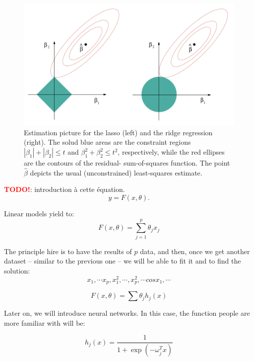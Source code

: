 \documentclass[a4paper]{tufte-book}
\newcommand{\TODO}{\textcolor{red}{\bf TODO!}\xspace}
\begin{document}
\begin{figure}
    \includegraphics{./Figures/sparsity.png}
    \caption{Estimation picture for the lasso (left) and the ridge regression
        (right). The solud blue areas are the constraint regions
        $|\beta_1| + |\beta_2| \leq t$ and $\beta_1^2 + \beta_2^2 \leq t^2$,
        respectively, while the red ellipses are the contours of the residual-
        sum-of-squares function. The point $\hat \beta$ depicts the usual
        (unconstrained) least-squares estimate.
    }
    \label{sparsity}
\end{figure}

\TODO: introduction à cette équation.
\begin{equation}
    y=F(x,\theta).
\end{equation}

Linear models yield to:
\begin{equation}
    F(x,\theta) = \sum_{j=1}^p \theta_j x_j
\end{equation}

The principle hire is to have the results of $p$ data, and then, once we get 
another dataset -- similar to the previous one -- we will be able to fit it and
to find the solution:
\begin{equation}
    x_1, \cdots x_p, x_1^2, \cdots, x_p^2, \cdots cos x_1, \cdots
\end{equation}

\begin{equation}
    F(x, \theta) = \sum \theta_j h_j(x)
\end{equation}

Later on, we will introduce neural networks. In this case, the function people
are more familiar with will be:

\begin{equation}
    h_j(x) = \frac{1}{1 + \exp (-\omega_j^T x )}
\end{equation}
\end{document}
